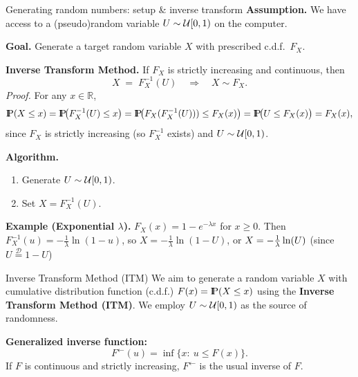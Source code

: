 \documentclass[aspectratio=169]{beamer}
\newcommand{\Prob}{{\rm I\hspace{-0.8mm}P}}
\begin{document}
%
\begin{frame}{Generating random numbers: setup \& inverse transform}
\textbf{Assumption.} We have access to a (pseudo)random variable \(U\sim{\cal U}[0,1)\) on the computer.

\medskip
\textbf{Goal.} Generate a target random variable \(X\) with prescribed c.d.f.\ \(F_X\).

\medskip
\textbf{Inverse Transform Method.} If \(F_X\) is strictly increasing and continuous, then
\[
X \;=\; F_X^{-1}(U)\quad\Rightarrow\quad X\sim F_X .
\]
\pause
\smallskip
\textit{Proof.} For any \(x\in\mathbb{R}\),
\[
\Prob(X\le x)
= \Prob\!\big(F_X^{-1}(U)\le x\big)
=\Prob\!\big(F_X(F_X^{-1}(U))) \le F_X(x)\big)
= \Prob\!\big(U \le F_X(x)\big)
= F_X(x),
\]
since \(F_X\) is strictly increasing (so \(F_X^{-1}\) exists) and \(U\sim{\cal U}[0,1)\).

\medskip \pause
\textbf{Algorithm.}
\begin{enumerate}
  \item Generate \(U\sim{\cal U}[0,1)\).
  \item Set \(X=F_X^{-1}(U)\).
\end{enumerate}

\medskip
\textbf{Example (Exponential \(\lambda\)).} \(F_X(x)=1-e^{-\lambda x}\) for \(x\ge 0\).
Then \(F_X^{-1}(u)= -\tfrac{1}{\lambda}\ln(1-u)\), so \(X= -\tfrac{1}{\lambda}\ln(1-U)\), or $X=-{1\over \lambda}\ln(U)$ (since $U\stackrel{\mathcal{D}}{=}1-U$)
\end{frame}






\begin{frame}{Inverse Transform Method (ITM)}
We aim to generate a random variable \(X\) with cumulative distribution function (c.d.f.)
\(F(x)=\Prob(X\leq x)\) using the \textbf{Inverse Transform Method (ITM)}.
We employ \(U\sim{\cal U}[0,1)\) as the source of randomness.

\medskip
\textbf{Generalized inverse function:}
\[
F^{\leftarrow}(u)=\inf\{x:\ u\le F(x)\}.
\]
If \(F\) is continuous and strictly increasing, \(F^{\leftarrow}\) is the usual inverse of \(F\).


\end{frame}
\end{document}
